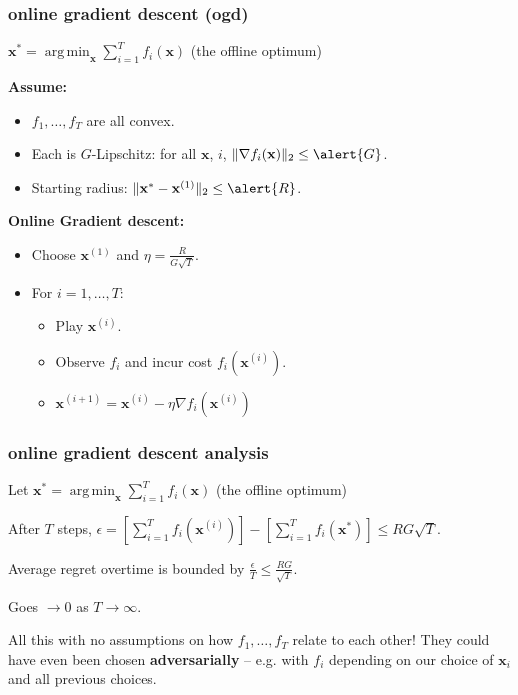 \documentclass[compress]{beamer}
\newcommand{\bv}[1]{\mathbf{#1}}
\DeclareMathOperator*{\argmin}{arg\,min}
\begin{document}
\begin{frame}[t]
	\frametitle{online gradient descent (ogd)}
	$\bv{x}^{*} = \argmin_\bv{x}\sum_{i=1}^T f_i(\bv{x})$ (the offline optimum)
	
	\textbf{Assume:}
	\begin{itemize}
		\item $f_1, \ldots, f_T$ are all convex.
		\item Each is $G$-Lipschitz: for all $\bv{x}$, $i$, $\|\nabla f_i(\bv{x})\|_2 \leq \alert{G}$.
		\item Starting radius: $\|\bv{x}^{*} - \bv{x}^{(1)}\|_2 \leq \alert{R}$.
	\end{itemize}
	
	\textbf{Online Gradient descent:}
	\begin{itemize}
	\item Choose $\bv{x}^{(1)}$ and $\eta = \frac{R}{G\sqrt{T}}$. 
	\item For $i = 1,\ldots, T$:
	\begin{itemize}
		\item Play $\bv{x}^{(i)}$.
		\item Observe $f_{i}$ and incur cost $f_{i}(\bv{x}^{(i)})$. 
		\item $\bv{x}^{(i+1)} = \bv{x}^{(i)} - \eta \nabla f_i(\bv{x}^{(i)})$
	\end{itemize}
\end{itemize}
\end{frame}

\begin{frame}[t]
	\frametitle{online gradient descent analysis} 
Let $\bv{x}^{*} = \argmin_\bv{x}\sum_{i=1}^T f_i(\bv{x})$ (the offline optimum)
	\begin{theorem}
		After $T$ steps, $\epsilon = \left[\sum_{i=1}^T f_i(\bv{x}^{(i)})\right] - \left[\sum_{i=1}^T f_i(\bv{x}^*)\right] \leq RG\sqrt{T}$.
	\end{theorem}
	Average regret overtime is bounded by $\frac{\epsilon}{T} \leq \frac{RG}{\sqrt{T}}$.
	
	Goes $\rightarrow 0$ as $T\rightarrow \infty$. 
	
	\begin{center}
		All this with no assumptions on how $f_1, \ldots, f_T$ relate to each other! They could have even been chosen \alert{\textbf{adversarially}} -- e.g. with $f_i$ depending on our choice of $\bv{x}_i$ and all previous choices. 
	\end{center}
\end{frame}
\end{document}
